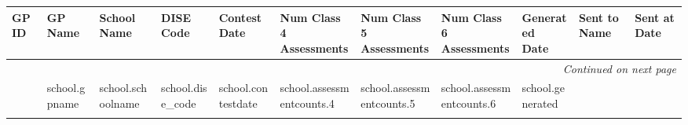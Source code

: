 \documentclass[12pt]{article}
\begin{document}
\begin{longtable}{|l|p{3cm}|p{4cm}|p{2.5cm}|p{1.5cm}|l|l|l|l|p{1.5cm}|p{1.5cm}|}
\hline
	GP ID & GP Name & School Name & DISE Code & Contest Date & \makecell{Num Class 4\\ Assessments}& \makecell{Num Class 5\\ Assessments}& \makecell{Num Class 6\\ Assessments}& \makecell{Generated\\Date} & Sent to Name & Sent at Date\\ \hline \endhead 
	\hline \multicolumn{11}{r}{\textit{Continued on next page}} \\ \endfoot
	\hline \endlastfoot
{%
	{{school.gpid}} & {{school.gpname}} & {{ school.schoolname }} & {{ school.dise_code }} &  {{school.contestdate}} & {{school.assessmentcounts.4}} & {{school.assessmentcounts.5}} & {{school.assessmentcounts.6}} & {{school.generated}} &  & \\ \hline
{%
\end{longtable}
\end{document}
